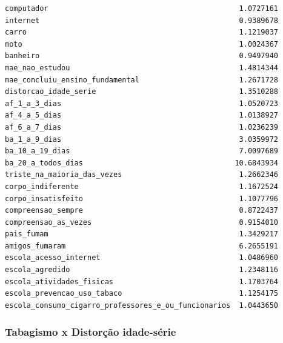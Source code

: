 \documentclass[
]{article}
\begin{document}
\begin{verbatim}
computador                                            1.0727161
internet                                              0.9389678
carro                                                 1.1219037
moto                                                  1.0024367
banheiro                                              0.9497940
mae_nao_estudou                                       1.4814344
mae_concluiu_ensino_fundamental                       1.2671728
distorcao_idade_serie                                 1.3510288
af_1_a_3_dias                                         1.0520723
af_4_a_5_dias                                         1.0138927
af_6_a_7_dias                                         1.0236239
ba_1_a_9_dias                                         3.0359972
ba_10_a_19_dias                                       7.0097689
ba_20_a_todos_dias                                   10.6843934
triste_na_maioria_das_vezes                           1.2662346
corpo_indiferente                                     1.1672524
corpo_insatisfeito                                    1.1077796
compreensao_sempre                                    0.8722437
compreensao_as_vezes                                  0.9154010
pais_fumam                                            1.3429217
amigos_fumaram                                        6.2655191
escola_acesso_internet                                1.0486960
escola_agredido                                       1.2348116
escola_atividades_fisicas                             1.1703764
escola_prevencao_uso_tabaco                           1.1254175
escola_consumo_cigarro_professores_e_ou_funcionarios  1.0443650
\end{verbatim}

\hypertarget{tabagismo-x-distoruxe7uxe3o-idade-suxe9rie}{%
\subsubsection{Tabagismo x Distorção
idade-série}\label{tabagismo-x-distoruxe7uxe3o-idade-suxe9rie}}
\end{document}
